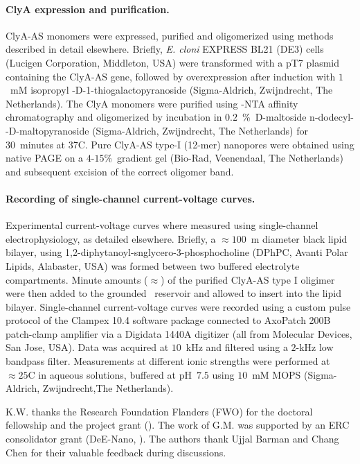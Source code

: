 \documentclass[journal=ancac3,manuscript=article,etalmode=truncate,maxauthors=0,layout=twocolumn]{achemso}
\begin{document}
\paragraph{ClyA expression and purification.}
ClyA-AS monomers were expressed, purified and oligomerized using methods described in detail
elsewhere.\cite{Soskine-2012,Soskine-2013} Briefly, \textit{E. cloni} EXPRESS BL21 (DE3) cells (Lucigen
Corporation, Middleton, USA) were transformed with a pT7 plasmid containing the ClyA-AS gene, followed by
overexpression after induction with $1$~mM isopropyl \textbeta-D-1-thiogalactopyranoside (Sigma-Aldrich,
Zwijndrecht, The Netherlands). The ClyA monomers were purified using -NTA affinity chromatography and
oligomerized by incubation in $0.2$~\%\ D-maltoside n-dodecyl-\textbeta-D-maltopyranoside (Sigma-Aldrich,
Zwijndrecht, The Netherlands) for 30~minutes at 37\textdegree C. Pure ClyA-AS type-I (12-mer) nanopores were
obtained using native PAGE on a $4$-$15$\%\ gradient gel (Bio-Rad, Veenendaal, The Netherlands) and
subsequent excision of the correct oligomer band.

\paragraph{Recording of single-channel current-voltage curves.}
Experimental current-voltage curves where measured using single-channel electrophysiology, as detailed
elsewhere.\cite{Maglia-2010,Soskine-2012,Soskine-2013} Briefly, a $\approx100$~\textmu m diameter
black lipid bilayer, using 1,2-diphytanoyl-snglycero-3-phosphocholine (DPhPC, Avanti Polar Lipids, Alabaster,
USA) was formed between two buffered electrolyte compartments. Minute amounts ($\approx$) of the purified
ClyA-AS type I oligimer were then added to the grounded \cis\ reservoir and allowed to insert into the lipid
bilayer. Single-channel current-voltage curves were recorded using a custom pulse protocol of the Clampex
10.4 software package connected to AxoPatch 200B patch-clamp amplifier via a Digidata 1440A digitizer (all
from Molecular Devices, San Jose, USA). Data was acquired at $10$~kHz and filtered using a $2$-kHz low
bandpass filter. Measurements at different ionic strengths were performed at $\approx25$\textdegree C in
aqueous  solutions, buffered at pH~$7.5$ using $10$~mM MOPS (Sigma-Aldrich, Zwijndrecht,The
Netherlands).

\begin{acknowledgement}
K.W. thanks the Research Foundation Flanders (FWO) for the doctoral fellowship and the project grant
(). The work of G.M. was supported by an ERC consolidator grant (DeE-Nano, ).
The authors thank Ujjal Barman and Chang Chen for their valuable feedback during discussions.
\end{acknowledgement}
\end{document}
